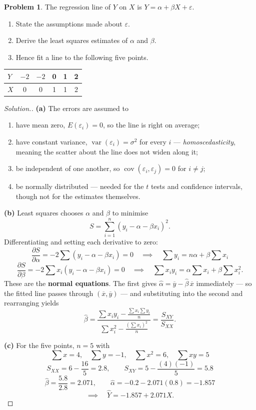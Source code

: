 \documentclass[11pt,a4paper]{article}
\theoremstyle{definition}
\newtheorem{problemx}{Problem}[section]
\newenvironment{problem}{\begin{problemx}}{\end{problemx}}
\newenvironment{solution}
  {\renewcommand{\qedsymbol}{}\begin{proof}[\textit{Solution}.]}
  {\end{proof}}
\begin{document}
\begin{problem}
The regression line of $Y$ on $X$ is $Y=\alpha+\beta X+\varepsilon$.
\begin{enumerate}
\item[(a).] State the assumptions made about $\varepsilon$.
\item[(b).] Derive the least squares estimates of $\alpha$ and $\beta$.
\item[(c).] Hence fit a line to the following five points.
\end{enumerate}
\begin{table}[H]
\centering
\begin{tabular}{|l|c|c|c|c|c|}
\hline
$Y$ & $-2$ & $-2$ & 0 & 1 & 2\\
\hline
$X$ & 0 & 0 & 1 & 1 & 2\\
\hline
\end{tabular}
\end{table}
\end{problem}

\begin{solution}
\textbf{(a)} The errors are assumed to
\begin{enumerate}
\item[(i).] have mean zero, $E(\varepsilon_i)=0$, so the line is right on average;
\item[(ii).] have constant variance, $\operatorname{var}(\varepsilon_i)=\sigma^2$ for every
$i$ --- \emph{homoscedasticity}, meaning the scatter about the line does not widen along it;
\item[(iii).] be independent of one another, so
$\operatorname{cov}(\varepsilon_i,\varepsilon_j)=0$ for $i\neq j$;
\item[(iv).] be normally distributed --- needed for the $t$ tests and confidence intervals,
though not for the estimates themselves.
\end{enumerate}

\textbf{(b)} Least squares chooses $\alpha$ and $\beta$ to minimise
\[S=\sum_{i=1}^{n}\left(y_i-\alpha-\beta x_i\right)^2.\]
Differentiating and setting each derivative to zero:
\[\frac{\partial S}{\partial \alpha}=-2\sum\left(y_i-\alpha-\beta x_i\right)=0
\quad\implies\quad \sum y_i=n\alpha+\beta\sum x_i\]
\[\frac{\partial S}{\partial \beta}=-2\sum x_i\left(y_i-\alpha-\beta x_i\right)=0
\quad\implies\quad \sum x_iy_i=\alpha\sum x_i+\beta\sum x_i^2.\]
These are the \textbf{normal equations}. The first gives
$\widehat{\alpha}=\overline{y}-\widehat{\beta}\,\overline{x}$ immediately --- so the fitted
line passes through $(\overline{x},\overline{y})$ --- and substituting into the second and
rearranging yields
\[\widehat{\beta}=\frac{\sum x_iy_i-\frac{\sum x_i\sum y_i}{n}}{\sum x_i^2-\frac{(\sum x_i)^2}{n}}
=\frac{S_{XY}}{S_{XX}}.\]

\textbf{(c)} For the five points, $n=5$ with
\[\sum x=4,\quad \sum y=-1,\quad \sum x^2=6,\quad \sum xy=5\]
\[S_{XX}=6-\frac{16}{5}=2.8,\qquad S_{XY}=5-\frac{(4)(-1)}{5}=5.8\]
\[\widehat{\beta}=\frac{5.8}{2.8}=2.071,\qquad
\widehat{\alpha}=-0.2-2.071(0.8)=-1.857\]
\[\implies\quad \widehat{Y}=-1.857+2.071X.\]
\end{solution}
\end{document}
